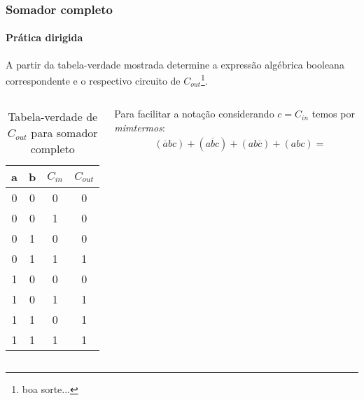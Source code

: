 \begin{frame}
	\frametitle{Somador completo}
	\framesubtitle{\textbf{Prática dirigida}}
	\par A partir da tabela-verdade mostrada determine a expressão algébrica booleana correspondente e o respectivo circuito de $C_{out}$\footnote[frame]{boa sorte...}.
	
	\begin{columns}
			\begin{table}[h!]
				\centering
				\begin{tabular}{|c|c|c|c|}
					\hline
					a & b & $C_{in}$ & $C_{out}$ \\
					\hline
					0 & 0 & 0 & 0 \\
					0 & 0 & 1 & 0 \\
					0 & 1 & 0 & 0 \\
					0 & 1 & 1 & 1 \\
					1 & 0 & 0 & 0 \\
					1 & 0 & 1 & 1 \\
					1 & 1 & 0 & 1 \\
					1 & 1 & 1 & 1 \\
					\hline
				\end{tabular}
				\caption{Tabela-verdade de $C_{out}$ para somador completo}
				\label{tab:carry_out2}
			\end{table}
			\par Para facilitar a notação considerando $c=C_{in}$ temos por \textit{mimtermos}:
			\begin{equation}
				\begin{aligned}
					&(\overline{a}bc)+(a\overline{b}c)+(ab\overline{c})+(abc) = \\
				\end{aligned}
			\end{equation}
	\end{columns}
\end{frame}

